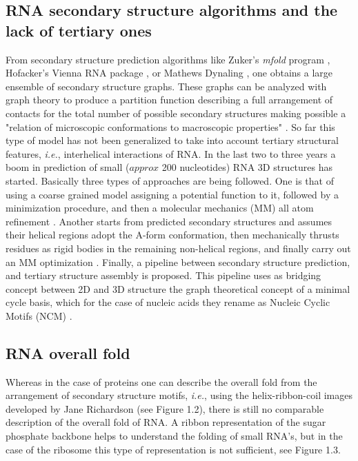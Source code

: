 \subsection{RNA secondary structure algorithms and the lack of
tertiary  ones} From  secondary structure  prediction  algorithms like
Zuker's \textit{mfold} program \cite{zuker2003}, Hofacker's Vienna RNA
package  \cite{hofacker1994}, or Mathews  Dynaling \cite{mathews2002},
one  obtains a large  ensemble of  secondary structure  graphs.  These
graphs  can be  analyzed  with  graph theory  to  produce a  partition
function  describing a  full  arrangement of  contacts  for the  total
number of possible secondary structures making possible a "relation of
microscopic      conformations     to      macroscopic     properties"
\cite{chen2000}. So far this type of model has not been generalized to
take  into   account  tertiary  structural   features,  \textit{i.e.},
interhelical interactions of RNA.
In the  last two to  three years a
boom  in  prediction  of  small  ($approx$  200  nucleotides)  RNA  3D
structures has started. Basically  three types of approaches are being
followed.  One is that  of using  a coarse  grained model  assigning a
potential function  to it, followed  by a minimization  procedure, and
then  a molecular  mechanics (MM)  all atom  refinement \cite{das2007,
  ding2008,  jonikas2009a}. Another  starts  from predicted  secondary
structures  and  assumes  their   helical  regions  adopt  the  A-form
conformation, then mechanically thrusts residues as rigid bodies in the
remaining non-helical regions, and finally carry out an MM optimization
\cite{martinez2008}.  Finally,  a pipeline between  secondary structure
prediction, and tertiary structure assembly is proposed. This pipeline
uses  as  bridging concept  between  2D  and  3D structure  the  graph
theoretical concept  of a minimal cycle  basis, which for  the case of
nucleic acids they rename as Nucleic Cyclic Motifs (NCM) \cite{parisien2008}.

\subsection{RNA overall fold}
Whereas in the case of proteins one can describe the overall fold from
the  arrangement of secondary  structure motifs,  \textit{i.e.}, using
the   helix-ribbon-coil   images    developed   by   Jane   Richardson
\cite{richardson2000} (see  Figure 1.2), there is  still no comparable
description of the overall fold of RNA. A ribbon representation of the
sugar  phosphate backbone  helps to  understand the  folding  of small
RNA's, but in the case of  the ribosome this type of representation is
not sufficient, see Figure 1.3.

